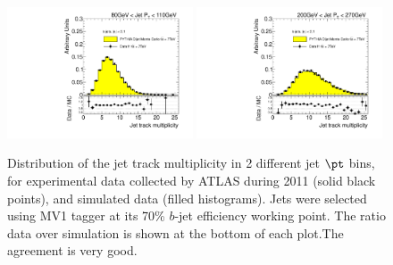 \begin{figure}[tp]
\centering
\includegraphics[width=0.49\textwidth]{FIGS/dataMCMV170/FullDataVarNtrkPT080.pdf}
\includegraphics[width=0.49\textwidth]{FIGS/dataMCMV170/FullDataVarNtrkPT200.pdf}
\caption{ Distribution of the jet track multiplicity in 2 different jet $\pt$ bins, for experimental data  collected by ATLAS during 2011 (solid black points), and simulated data (filled histograms). Jets were selected using MV1 tagger at its 70\% $b$-jet efficiency working point. The ratio data over simulation is shown at the bottom of each plot.The agreement is very good.}
\label{fig:datamcinputvarsNTRKMV170}
\end{figure}

